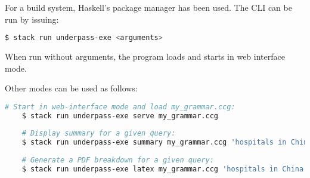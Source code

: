 \documentclass[main.tex]{subfiles}
\begin{document}

For a build system, Haskell's  package manager has been used. The
CLI can be run by issuing:
\begin{lstwrap}\begin{lstlisting}[language=bash]
    $ stack run underpass-exe <arguments>
\end{lstlisting}\end{lstwrap}

When run without arguments, the program loads 
and starts in web interface mode.

Other modes can be used as follows:
\begin{lstwrap}\begin{lstlisting}[language=bash]
    # Start in web-interface mode and load my_grammar.ccg:
    $ stack run underpass-exe serve my_grammar.ccg
    
    # Display summary for a given query:
    $ stack run underpass-exe summary my_grammar.ccg 'hospitals in China'
    
    # Generate a PDF breakdown for a given query:
    $ stack run underpass-exe latex my_grammar.ccg 'hospitals in China'
\end{lstlisting}\end{lstwrap}

\end{document}
